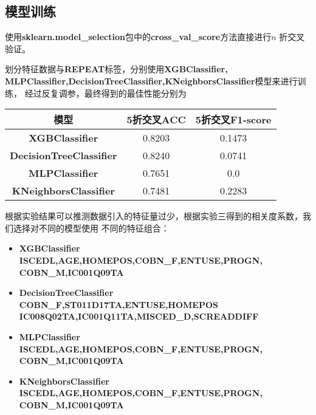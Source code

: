 \documentclass[12pt, a4paper, oneside]{ctexart}
\begin{document}
\subsection{模型训练}
使用\textbf{sklearn.model\_selection}包中的\textbf{cross\_val\_score}方法直接进行$n$
折交叉验证。

划分特征数据与\textbf{REPEAT}标签，分别使用\textbf{XGBClassifier,
MLPClassifier,DecisionTreeClassifier,KNeighborsClassifier}模型来进行训练，
经过反复调参，最终得到的最佳性能分别为

\begin{table*}[h]
    \centering%
    \begin{tabular}{ccc}%
    \toprule%
    模型&5折交叉ACC& 5折交叉F1-score\\
    \midrule%
    \textbf{XGBClassifier} &0.8203 &0.1473\\
    \textbf{DecisionTreeClassifier} &0.8240 &0.0741\\
    \textbf{MLPClassifier} &0.7651 &0.0\\
    \textbf{KNeighborsClassifier} & 0.7481 &0.2283\\

    \bottomrule%
    \end{tabular}
\end{table*}

根据实验结果可以推测数据引入的特征量过少，根据实验三得到的相关度系数，我们选择对不同的模型使用
不同的特征组合：
\begin{itemize}
    \item \textbf{XGBClassifier} \\ 
    \textbf{ISCEDL,AGE,HOMEPOS,COBN\_F,ENTUSE,PROGN,\\
    COBN\_M,IC001Q09TA}
    \item \textbf{DecisionTreeClassifier}\\
    \textbf{COBN\_F,ST011D17TA,ENTUSE,HOMEPOS\\
    IC008Q02TA,IC001Q11TA,MISCED\_D,SCREADDIFF}
    \item \textbf{MLPClassifier}\\
    \textbf{ISCEDL,AGE,HOMEPOS,COBN\_F,ENTUSE,PROGN,\\
    COBN\_M,IC001Q09TA}
    \item \textbf{KNeighborsClassifier}\\
    \textbf{ISCEDL,AGE,HOMEPOS,COBN\_F,ENTUSE,PROGN,\\
    COBN\_M,IC001Q09TA} 
\end{itemize}
\end{document}
